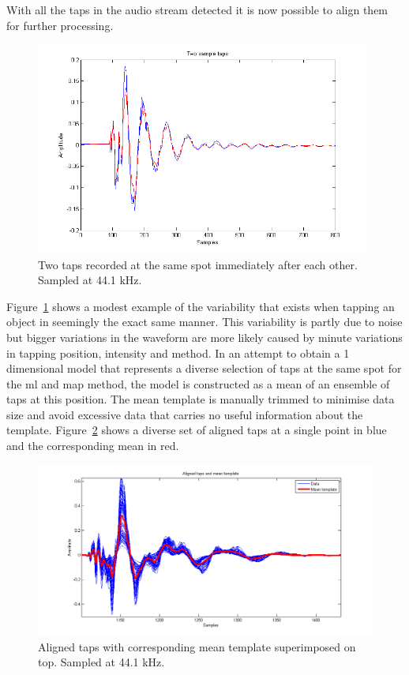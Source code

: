 With all the taps in the audio stream detected it is now possible to align them for further processing.

\begin{figure}[!]
\centering
\includegraphics[width=110mm]{twoSampleTaps.png}
\caption{Two taps recorded at the same spot immediately after each other. Sampled at 44.1 kHz.}\label{fig:twoSampleTaps}
\end{figure}

Figure~\ref{fig:twoSampleTaps} shows a modest example of the variability that exists when tapping an object in seemingly the exact same manner. This variability is partly due to noise but bigger variations in the waveform are more likely caused by minute variations in tapping position, intensity and method. In an attempt to obtain a 1 dimensional model that represents a diverse selection of taps at the same spot for the \gls{ml} and \gls{map} method, the model is constructed as a mean of an ensemble of taps at this position. The mean template is manually trimmed to minimise data size and avoid excessive data that carries no useful information about the template. Figure~\ref{fig:alignedAndMean} shows a diverse set of aligned taps at a single point in blue and the corresponding mean in red.

\begin{figure}[!]
\centering
\includegraphics[width=150mm]{alignedAndMean.png}
\caption{Aligned taps with corresponding mean template superimposed on top. Sampled at 44.1 kHz.}\label{fig:alignedAndMean}
\end{figure}

